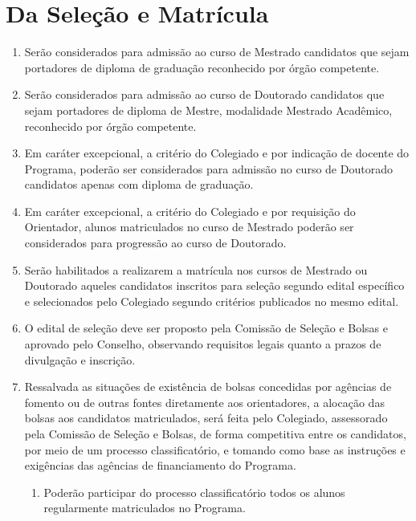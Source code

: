\documentclass{article}
\newcommand{\grupoMenor}{Colegiado\xspace}
\newcommand{\grupoMaior}{Conselho\xspace}
\begin{document}
\section{Da Seleção e Matrícula}
\begin{enumerate}
	\item Serão considerados para admissão ao curso de Mestrado candidatos que sejam portadores de diploma de graduação reconhecido por órgão competente.

	\item Serão considerados para admissão ao curso de Doutorado candidatos que sejam portadores de diploma de Mestre, modalidade Mestrado Acadêmico, reconhecido por órgão competente.

	\item Em caráter excepcional, a critério do \grupoMenor e por indicação de docente do Programa, poderão ser considerados para admissão no curso de Doutorado candidatos apenas com diploma de graduação.

	\item Em caráter excepcional, a critério do \grupoMenor e por requisição do Orientador, alunos matriculados no curso de Mestrado poderão ser considerados para progressão ao curso de Doutorado.

	\item Serão habilitados a realizarem a matrícula nos cursos de Mestrado ou Doutorado aqueles candidatos inscritos para seleção segundo edital específico e selecionados pelo \grupoMenor segundo critérios publicados no mesmo edital.

	\item O edital de seleção deve ser proposto pela Comissão de Seleção e Bolsas e aprovado pelo \grupoMaior, observando requisitos legais quanto a prazos de divulgação e inscrição.

	\item Ressalvada as situações de existência de bolsas concedidas por agências de fomento ou de outras fontes diretamente aos orientadores, a alocação das bolsas aos candidatos matriculados, será feita pelo \grupoMenor, assessorado pela Comissão de Seleção e Bolsas, de forma competitiva entre os candidatos, por meio de um processo classificatório, e tomando como base as instruções e exigências das agências de financiamento do Programa.
	\begin{enumerate}
		\item Poderão participar do processo classificatório todos os alunos regularmente matriculados no Programa.
	\end{enumerate}
	

\end{enumerate}
\end{document}
